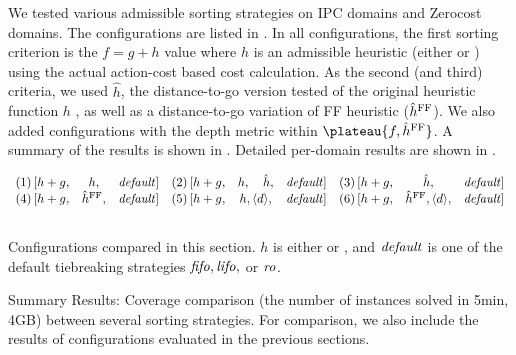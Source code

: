 We tested various admissible sorting strategies on IPC domains and Zerocost domains.
The configurations are listed in . 
In all configurations, the first sorting criterion is the $f=g+h$ value
where $h$ is an admissible heuristic (either \lmcut or \mands) using the actual action-cost based  cost calculation.
As the second (and third) criteria,
we used $\hat{h}$, the distance-to-go version tested  of the original heuristic function $h$ , as well as a distance-to-go variation of FF
heuristic ($\hat{h}^{\ff}$).
We also added configurations with the depth metric within
$\plateau{f,\hat{h}^{\text{\ff}}}$.
A summary of the results is shown in .
Detailed per-domain results are shown in .

\begin{table}[htbp]
 \centering
 \[
 \begin{array}{lcllcllcl}
  (1)\, [h+g, & h,                      &\mit{default}] & %
  (2)\, [h+g, & h,     \quad   \hat{h}, &\mit{default}] & %
  (3)\, [h+g, & \hat{h},                &\mit{default}]     \\\relax
  (4)\, [h+g, & \hat{h}^{\ff},          &\mit{default}] & %
  (5)\, [h+g,   & h, \depth,                   &\mit{default}] & %
  (6)\, [h+g,   & \hat{h}^{\text{FF}}, \depth, &\mit{default}]     \\\relax
 \end{array}
 \]
 \vspace{-3em}
 \caption{Configurations compared in this section. $h$ is
 either \lmcut or \mands, and $\mit{default}$ is one of the default
 tiebreaking strategies $\fifo,\lifo,$ or $\ro$. }
 \label{list:distance-configs}
\end{table}

\begin{table}[htbp]
 \centering
 
 \caption{
 Summary Results: Coverage comparison (the number
 of instances solved in 5min, 4GB) between several sorting strategies.
 For comparison, we also include the results of configurations evaluated in the previous sections.
 }
 \label{tbl:dtg-summary}
\end{table}

